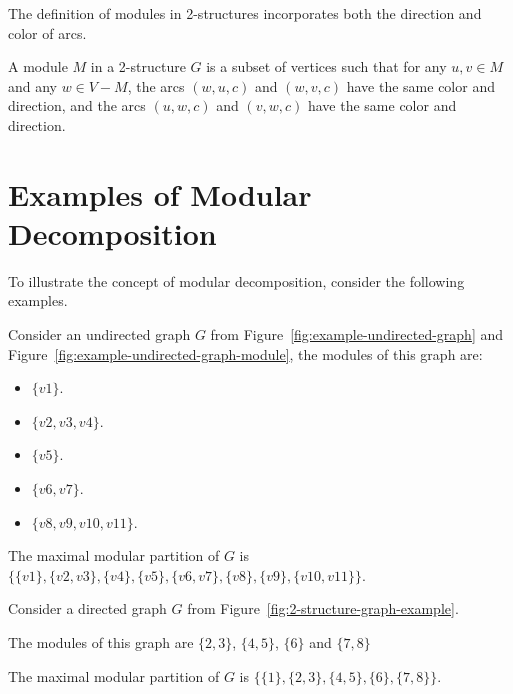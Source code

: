 The definition of modules in 2-structures incorporates both the direction and color of arcs.

\begin{mydef}
    A module $M$ in a 2-structure $G$ is a subset of vertices such that for any $u, v \in M$ and any $w \in V - M$, the arcs $(w, u, c)$ and $(w, v, c)$ have the same color and direction, and the arcs $(u, w, c)$ and $(v, w, c)$ have the same color and direction.
\end{mydef}


\section{Examples of Modular Decomposition}\label{sec:examples-of-modular-decomposition}

To illustrate the concept of modular decomposition, consider the following examples.


\begin{myex}
    \label{ex:simple-undirected-graph}

Consider an undirected graph $G$ from Figure~\ref{fig:example-undirected-graph} and Figure~\ref{fig:example-undirected-graph-module}, the modules of this graph are:

\begin{itemize}
    \item $\{v1\}$.
    \item $\{v2, v3, v4\}$.
    \item $\{v5\}$.
    \item $\{v6, v7\}$.
    \item $\{v8, v9, v10, v11\}$.
\end{itemize}

The maximal modular partition of $G$ is $\{\{v1\}, \{v2, v3\}, \{v4\}, \{v5\}, \{v6, v7\}, \{v8\}, \{v9\}, \{v10, v11\}\}$.
\end{myex}

\begin{myex}
    Consider a directed graph $G$ from Figure~\ref{fig:2-structure-graph-example}.

    The modules of this graph are $\{2, 3\}$, $\{4, 5\}$, $\{6\}$ and $\{7, 8\}$

    The maximal modular partition of $G$ is $\{\{1\}, \{2, 3\}, \{4, 5\}, \{6\}, \{7, 8\}\}$.
\end{myex}


